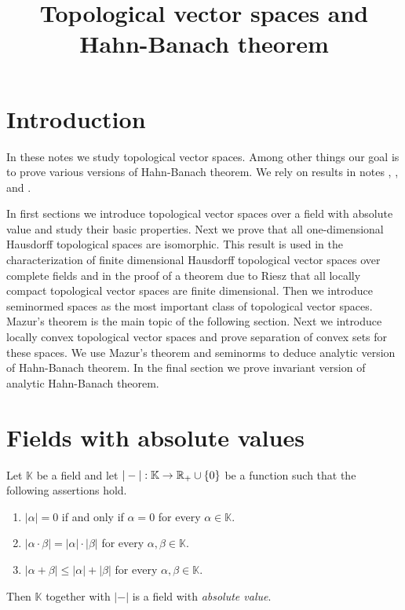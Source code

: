 \documentclass[10pt]{amsart}
\begin{document}
\title{Topological vector spaces and Hahn-Banach theorem}
\date{}
\maketitle

\section{Introduction}
\noindent
In these notes we study topological vector spaces. Among other things our goal is to prove various versions of Hahn-Banach theorem. We rely on results in notes \cite{Topological_Spaces}, \cite{Filters_in_topology}, \cite{Uniform_Spaces} and \cite{Topological_groups}.

In first sections we introduce topological vector spaces over a field with absolute value and study their basic properties. Next we prove that all one-dimensional Hausdorff topological spaces are isomorphic. This result is used in the characterization of finite dimensional Hausdorff topological vector spaces over complete fields and in the proof of a theorem due to Riesz that all locally compact topological vector spaces are finite dimensional. Then we introduce seminormed spaces as the most important class of topological vector spaces. Mazur's theorem is the main topic of the following section. Next we introduce locally convex topological vector spaces and prove separation of convex sets for these spaces. We use Mazur's theorem and seminorms to deduce analytic version of Hahn-Banach theorem. In the final section we prove invariant version of analytic Hahn-Banach theorem.

\section{Fields with absolute values}

\begin{definition}
	Let $\mathbb{K}$ be a field and let $|-|:\mathbb{K}\rightarrow {\mathbb R}_+\cup \{0\}$ be a function such that the following assertions hold.
	\begin{enumerate}[label=\textbf{(\arabic*)}, leftmargin=*]
		\item $|\alpha| = 0$ if and only if $\alpha = 0$ for every $\alpha \in \mathbb{K}$.
		\item $|\alpha\cdot \beta| = |\alpha|\cdot |\beta|$ for every $\alpha,\beta \in \mathbb{K}$.
		\item $|\alpha + \beta|\leq |\alpha| + |\beta|$ for every $\alpha,\beta \in \mathbb{K}$.
	\end{enumerate}
	Then $\mathbb{K}$ together with $|-|$ is a field with \textit{absolute value}.
\end{definition}
\end{document}
